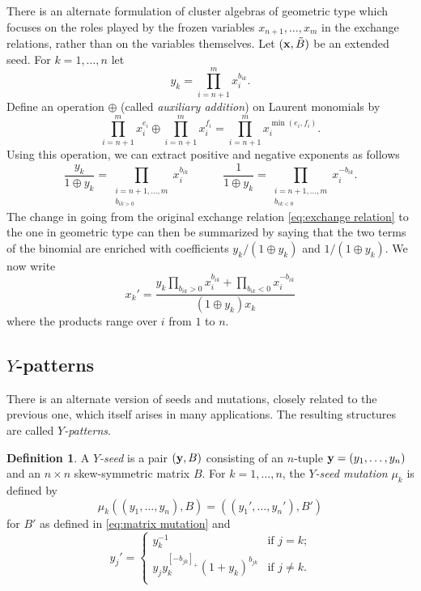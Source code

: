 \documentclass{amsart}
\theoremstyle{definition}
\newtheorem{definition}[theorem]{Definition}
\theoremstyle{remark}
\numberwithin{equation}{section}
\newcommand{\x}{{\bf x}}
\newcommand{\y}{{\bf y}}
\begin{document}
	There is an alternate formulation of cluster algebras of geometric type which focuses on the roles played by the frozen variables $x_{n+1},\ldots, x_m$ in the exchange relations, rather than on the variables themselves.  Let $(\x, \tilde{B})$ be an extended seed.  For $k=1,\ldots, n$ let 
	\begin{displaymath}
	y_k = \prod_{i=n+1}^m x_i^{b_{ik}}.
	\end{displaymath}
	Define an operation $\oplus$ (called \emph{auxiliary addition}) on Laurent monomials by
	\begin{displaymath}
	\prod_{i=n+1}^m x_i^{e_i} \oplus \prod_{i=n+1}^m x_i^{f_i} = \prod_{i=n+1}^m x_i^{\min(e_i,f_i)}.
	\end{displaymath}
	Using this operation, we can extract positive and negative exponents as follows
	\begin{displaymath}
	\frac{y_k}{1 \oplus y_k} = \prod_{\substack{i=n+1,\ldots, m\\ b_{ik > 0}}} x_i^{b_{ik}}
	\quad \quad \quad \frac{1}{1 \oplus y_k} = \prod_{\substack{i=n+1,\ldots, m\\ b_{ik < 0}}} x_i^{-b_{ik}}.
	\end{displaymath}
	The change in going from the original exchange relation \eqref{eq:exchange relation} to the one in geometric type can then be summarized by saying that the two terms of the binomial are enriched with coefficients $y_k/(1 \oplus y_k)$ and $1/(1 \oplus y_k)$.  We now write
	\begin{displaymath} 
		x_k' = \frac{y_k\prod_{b_{ik}>0} x_i^{b_{ik}} + \prod_{b_{ik}<0} x_i^{-b_{ik}}}{(1 \oplus y_k)x_k}
	\end{displaymath}
	where the products range over $i$ from $1$ to $n$.
	
	\subsection{$Y$-patterns}
	There is an alternate version of seeds and mutations, closely related to the previous one, which itself arises in many applications.  The resulting structures are called \emph{$Y$-patterns}.
	
	\begin{definition}
		A \emph{$Y$-seed} is a pair $(\y,B)$ consisting of an $n$-tuple $\y=(y_1,\ldots, y_n)$ and an $n\times n$ skew-symmetric matrix $B$.  For $k=1,\ldots, n$, the \emph{$Y$-seed mutation} $\mu_k$ is defined by
		\begin{displaymath}
			\mu_k((y_1,\ldots, y_n),B) = ((y_1',\ldots, y_n'),B')
		\end{displaymath}
		for $B'$ as defined in \eqref{eq:matrix mutation} and 
		\begin{equation}\label{eq:y mutation}
		y_j' = \begin{cases}
		y_k^{-1} & \text{if $j = k$;} \\
		y_jy_k^{[-b_{jk}]_+}(1+y_k)^{b_{jk}} & \text{if $j \neq k$.} \\
		\end{cases}
		\end{equation}
	\end{definition}
	
\end{document}
